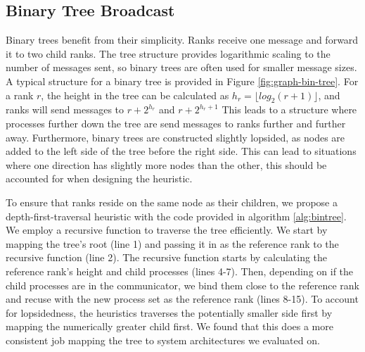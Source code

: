 \subsection{Binary Tree Broadcast}
Binary trees benefit from their simplicity.
Ranks receive one message and forward it to two child ranks.
The tree structure provides logarithmic scaling to the number of messages sent, so binary trees are often used for smaller message sizes. 
A typical structure for a binary tree is provided in Figure \ref{fig:graph-bin-tree}.
For a rank $r$, the height in the tree can be calculated as $h_r = \lfloor log_2(r+1) \rfloor$, and ranks will send messages to $r + 2^{h_r}$ and $r + 2^{h_r + 1}$
This leads to a structure where processes further down the tree are send messages to ranks further and further away.
Furthermore, binary trees are constructed slightly lopsided,  as nodes are added to the left side of the tree before the right side. 
This can lead to situations where one direction has slightly more nodes than the other, this should be accounted for when designing the heuristic.

To ensure that ranks reside on the same node as their children, we propose a depth-first-traversal heuristic with the code provided in algorithm \ref{alg:bintree}.
We employ a recursive function to traverse the tree efficiently. 
We start by mapping the tree's root (line 1) and passing it in as the reference rank to the recursive function (line 2).
The recursive function starts by calculating the reference rank's height and child processes (lines 4-7). 
Then, depending on if the child processes are in the communicator, we bind them close to the reference rank and recuse with the new process set as the reference rank (lines 8-15).
To account for lopsidedness, the heuristics traverses the potentially smaller side first by mapping the numerically greater child first.
We found that this does a more consistent job mapping the tree to system architectures we evaluated on.


% 


